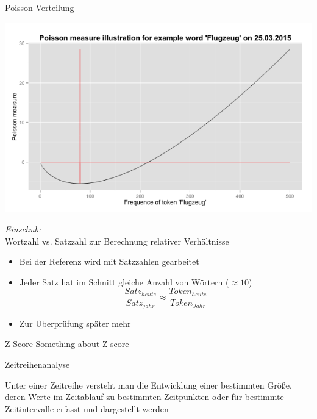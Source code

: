 \documentclass{beamer}
\begin{document}
\begin{frame}{Poisson-Verteilung}
	  \begin{centering}
	  \includegraphics[width=1\textwidth]{pictures/poissonMeasureFlugzeug.png}
	\end{centering}
\end{frame}

\begin{frame}{\emph{Einschub: }\\Wortzahl vs. Satzzahl zur Berechnung relativer Verh\"altnisse}
	\begin{itemize}
		\item{Bei der Referenz wird mit Satzzahlen gearbeitet}
		
		\item{Jeder Satz hat im Schnitt gleiche Anzahl von W\"ortern ($\approx 10$)\\
			\begin{equation}
				\frac{Satz_{heute}}{Satz_{jahr}} \approx \frac{Token_{heute}}{Token_{Jahr}}
			\end {equation}
			}
		\item{Zur \"Uberpr\"ufung sp\"ater mehr}
	\end{itemize}
\end{frame}


\begin{frame}{Z-Score}
	Something about Z-score
\end{frame}

\begin{frame}{Zeitreihenanalyse}
 \begin{definition}[Zeitreihenanalyse]
 	Unter einer Zeitreihe
	versteht man die Entwicklung einer bestimmten Größe, deren Werte im Zeitablauf zu bestimmten Zeitpunkten oder für bestimmte Zeitintervalle erfasst und dargestellt
	werden
 \end{definition}
	
\end{frame}
\end{document}
